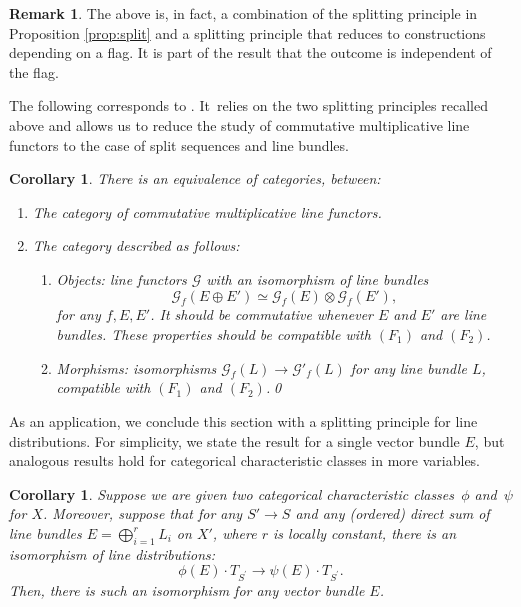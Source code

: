 \documentclass[JEP,XML,SOM,Unicode,published]{cedram}
\theoremstyle{plain}
\newtheorem{corollary}[theorem]{Corollary}
\theoremstyle{definition}
\newtheorem{remark}[theorem]{Remark}
\newcommand{\Gcal}{\mathcal G}
\begin{document}
\begin{remark}\label{rmk:indepedenceoffiltration}
The above is, in fact, a combination of the splitting principle in Proposition \ref{prop:split} and a splitting principle that reduces to constructions depending on a flag. It is part of the result that the outcome is independent of the flag.
\end{remark}

The following corresponds to \cite[Prop.\,2.16 \& Prop.\,2.19 \& Cor.\,2.20]{Eriksson-Freixas-Wentworth}. It~relies on the two splitting principles recalled above and allows us to reduce the study of commutative multiplicative line functors to the case of split sequences and line bundles.
\begin{corollary} \label{Cor:2ndsplitting}
There is an equivalence of categories, between:
\begin{enumerate}
\item The category of commutative multiplicative line functors.
\item The category described as follows:
\begin{enumerate}
\item Objects: line functors $\Gcal$ with an isomorphism of line bundles\vspace*{-3pt}\enlargethispage{.5\baselineskip}
\[
\Gcal_f(E \oplus E') \simeq \Gcal_f(E) \otimes \Gcal_f(E'),
\]
for any $f, E, E'$.
It should be commutative whenever $E$ and $E'$ are line bundles. These properties should be compatible with $(F_1)$ and $(F_2)$.
\item Morphisms: isomorphisms $\Gcal_f(L) \to \Gcal'_f(L)$ for any line bundle $L$, compatible with $(F_1)$ and $(F_2)$.\qed
\end{enumerate}
\end{enumerate}
\end{corollary}

As an application, we conclude this section with a splitting principle for line distributions. For simplicity, we state the result for a single vector bundle $E$, but analogous results hold for categorical characteristic classes in more variables.

\begin{corollary} \label{cor:splittingdistribution}
Suppose we are given two categorical characteristic classes~$\phi$ and~$\psi$ for $X$. Moreover, suppose that for any $S' \to S$ and any (ordered) direct sum of line bundles $E = \bigoplus_{i=1}^r L_i$ on $X'$, where $r$ is locally constant, there is an isomorphism of line distributions:\vspace*{-3pt}
\begin{displaymath}
\phi(E) \cdot T_{S^{\prime}} \to \psi(E) \cdot T_{S^{\prime}}.
\end{displaymath}
Then, there is such an isomorphism for any vector bundle $E$.
\end{corollary}
\end{document}

